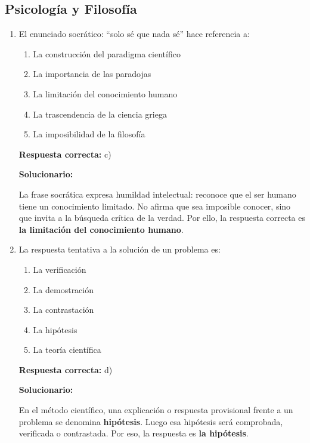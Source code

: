 \subsection*{Psicología y Filosofía}

\begin{enumerate}[resume]
	
	\item El enunciado socrático: ``solo sé que nada sé'' hace referencia a:
	\begin{enumerate}[label=\alph*)]
		\item La construcción del paradigma científico
		\item La importancia de las paradojas
		\item La limitación del conocimiento humano
		\item La trascendencia de la ciencia griega
		\item La imposibilidad de la filosofía
	\end{enumerate}
	\textbf{Respuesta correcta:} c)
	
	\vspace{2mm}
	\textbf{Solucionario:}
	
	La frase socrática expresa humildad intelectual: reconoce que el ser humano tiene un conocimiento limitado. No afirma que sea imposible conocer, sino que invita a la búsqueda crítica de la verdad. Por ello, la respuesta correcta es \textbf{la limitación del conocimiento humano}.
	
	\vspace{6mm}
	
	\item La respuesta tentativa a la solución de un problema es:
	\begin{enumerate}[label=\alph*)]
		\item La verificación
		\item La demostración
		\item La contrastación
		\item La hipótesis
		\item La teoría científica
	\end{enumerate}
	\textbf{Respuesta correcta:} d)
	
	\vspace{2mm}
	\textbf{Solucionario:}
	
	En el método científico, una explicación o respuesta provisional frente a un problema se denomina \textbf{hipótesis}. Luego esa hipótesis será comprobada, verificada o contrastada. Por eso, la respuesta es \textbf{la hipótesis}.
	

\end{enumerate}
